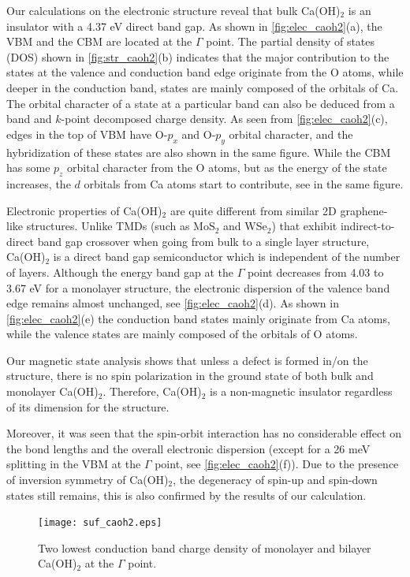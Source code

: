 Our calculations on the electronic structure reveal that bulk Ca(OH)$_2$ is 
an insulator with a 4.37 eV direct band gap. As shown in \autoref{fig:elec_caoh2}(a), the VBM and the CBM are located at the $\Gamma$ point. The partial density of 
states (DOS) shown in \autoref{fig:str_caoh2}(b) indicates that the major 
contribution to the states at the valence and conduction band edge originate 
from the O atoms, while deeper in the conduction band, states are mainly composed 
of the orbitals of Ca. The orbital character of a state at a particular band can 
also be deduced from a band and $k$-point decomposed charge density. As seen 
from \autoref{fig:elec_caoh2}(c), edges in the top of VBM have O-$p_x$ 
and O-$p_y$ orbital character, and the hybridization of these states are also 
shown in the same figure. While the CBM has some $p_z$ orbital 
character from the O atoms, but as the energy of the state increases, the $d$ 
orbitals from Ca atoms start to contribute, see  in the same figure.

Electronic properties of Ca(OH)$_2$ are quite different from similar
2D graphene-like structures. Unlike TMDs (such as MoS$_2$ and
WSe$_2$) that exhibit indirect-to-direct band gap crossover when going
from bulk to a single layer structure, Ca(OH)$_2$ is a direct band gap
semiconductor which is independent of the number of layers. Although the energy band gap
at the $\Gamma$ point decreases from 4.03 to 3.67 eV for a monolayer structure,
the electronic dispersion of the valence band edge remains almost unchanged, see
\autoref{fig:elec_caoh2}(d). As shown in \autoref{fig:elec_caoh2}(e)  
the conduction band states mainly originate from Ca atoms, while the valence states 
are mainly composed of the orbitals of O atoms. 

Our magnetic state analysis shows that unless a defect is formed in/on the 
structure, there is no spin polarization in the ground state of both bulk and monolayer Ca(OH)$_2$. Therefore, Ca(OH)$_2$ is a non-magnetic insulator regardless of its dimension for the structure. 

Moreover, it was seen that the spin-orbit interaction has no 
considerable effect on the bond lengths and the overall electronic dispersion 
(except for a 26 meV splitting in the VBM at the 
$\Gamma$ point, see \autoref{fig:elec_caoh2}(f)). Due to the presence of inversion symmetry of Ca(OH)$_2$, the 
degeneracy of spin-up and spin-down states still remains, this is also confirmed 
by the results of our calculation.

\begin{figure}[htbp]
\centering
\texttt{[image: suf\_caoh2.eps]}
\caption{\label{fig:suf_caoh2} Two lowest conduction band charge density of 
monolayer and bilayer Ca(OH)$_2$ at the $\Gamma$ point.}
\end{figure}


